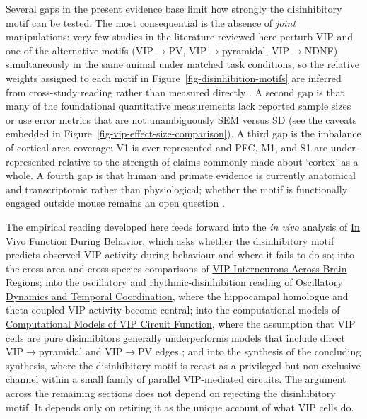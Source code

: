 \documentclass[11pt]{article}
\let\origrightarrow\rightarrow
\def\rightarrow{\ensuremath{\origrightarrow}}
\begin{document}
Several gaps in the present evidence base limit how strongly the disinhibitory motif can be tested. The most consequential is the absence of \textit{joint} manipulations: very few studies in the literature reviewed here perturb VIP and one of the alternative motifs (VIP\rightarrow PV, VIP\rightarrow pyramidal, VIP\rightarrow NDNF) simultaneously in the same animal under matched task conditions, so the relative weights assigned to each motif in Figure~\ref{fig-disinhibition-motifs} are inferred from cross-study reading rather than measured directly \citep{Pi2013, Lee2013, Fu2014, Pakan2016, Kuchibhotla2017, Veit2023}. A second gap is that many of the foundational quantitative measurements lack reported sample sizes or use error metrics that are not unambiguously SEM versus SD (see the caveats embedded in Figure~\ref{fig-vip-effect-size-comparison}). A third gap is the imbalance of cortical-area coverage: V1 is over-represented and PFC, M1, and S1 are under-represented relative to the strength of claims commonly made about `cortex' as a whole. A fourth gap is that human and primate evidence is currently anatomical and transcriptomic rather than physiological; whether the motif is functionally engaged outside mouse remains an open question \citep{Vanderveer2021}.

The empirical reading developed here feeds forward into the \textit{in vivo} analysis of \href{/in-vivo-behavior}{In Vivo Function During Behavior}, which asks whether the disinhibitory motif predicts observed VIP activity during behaviour and where it fails to do so; into the cross-area and cross-species comparisons of \href{/cross-areas}{VIP Interneurons Across Brain Regions}; into the oscillatory and rhythmic-disinhibition reading of \href{/oscillatory-dynamics}{Oscillatory Dynamics and Temporal Coordination}, where the hippocampal homologue and theta-coupled VIP activity become central; into the computational models of \href{/computational-models}{Computational Models of VIP Circuit Function}, where the assumption that VIP cells are pure disinhibitors generally underperforms models that include direct VIP\rightarrow pyramidal and VIP\rightarrow PV edges \citep{Hertag2019, Garciadelmolino2017, Litwinkumar2016, Tzilivaki2023}; and into the synthesis of the concluding synthesis, where the disinhibitory motif is recast as a privileged but non-exclusive channel within a small family of parallel VIP-mediated circuits. The argument across the remaining sections does not depend on rejecting the disinhibitory motif. It depends only on retiring it as the unique account of what VIP cells do.
\end{document}
